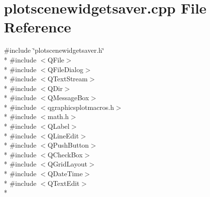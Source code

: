 \section{plotscenewidgetsaver.\+cpp File Reference}
\label{bk3_2plotsaver_2plotscenewidgetsaver_8cpp}
{\ttfamily \#include \char`\"{}plotscenewidgetsaver.\+h\char`\"{}}\\*
{\ttfamily \#include $<$Q\+File$>$}\\*
{\ttfamily \#include $<$Q\+File\+Dialog$>$}\\*
{\ttfamily \#include $<$Q\+Text\+Stream$>$}\\*
{\ttfamily \#include $<$Q\+Dir$>$}\\*
{\ttfamily \#include $<$Q\+Message\+Box$>$}\\*
{\ttfamily \#include $<$qgraphicsplotmacros.\+h$>$}\\*
{\ttfamily \#include $<$math.\+h$>$}\\*
{\ttfamily \#include $<$Q\+Label$>$}\\*
{\ttfamily \#include $<$Q\+Line\+Edit$>$}\\*
{\ttfamily \#include $<$Q\+Push\+Button$>$}\\*
{\ttfamily \#include $<$Q\+Check\+Box$>$}\\*
{\ttfamily \#include $<$Q\+Grid\+Layout$>$}\\*
{\ttfamily \#include $<$Q\+Date\+Time$>$}\\*
{\ttfamily \#include $<$Q\+Text\+Edit$>$}\\*
